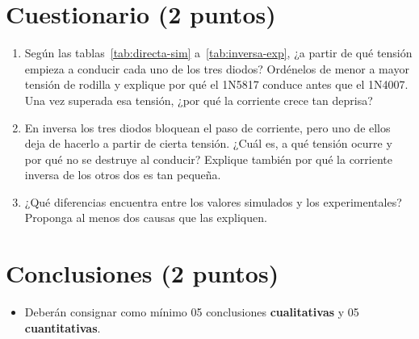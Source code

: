 \documentclass[11pt,a4paper]{article}
\newcommand{\puntos}[1]{\normalfont\normalsize\textmd{(#1 puntos)}}
\begin{document}
\section{Cuestionario \puntos{2}}
\begin{enumerate}[label=\arabic*., leftmargin=2em]
    \item Según las tablas~\ref{tab:directa-sim} a~\ref{tab:inversa-exp}, ¿a partir de
          qué tensión empieza a conducir cada uno de los tres diodos? Ordénelos de menor
          a mayor tensión de rodilla y explique por qué el 1N5817 conduce antes que el
          1N4007. Una vez superada esa tensión, ¿por qué la corriente crece tan deprisa?
    \item En inversa los tres diodos bloquean el paso de corriente, pero uno de ellos
          deja de hacerlo a partir de cierta tensión. ¿Cuál es, a qué tensión ocurre y
          por qué no se destruye al conducir? Explique también por qué la corriente
          inversa de los otros dos es tan pequeña.
    \item ¿Qué diferencias encuentra entre los valores simulados y los experimentales?
          Proponga al menos dos causas que las expliquen.
\end{enumerate}

\section{Conclusiones \puntos{2}}
\begin{itemize}
    \item Deberán consignar como mínimo 05 conclusiones \textbf{cualitativas} y 05
          \textbf{cuantitativas}.
\end{itemize}
\end{document}
